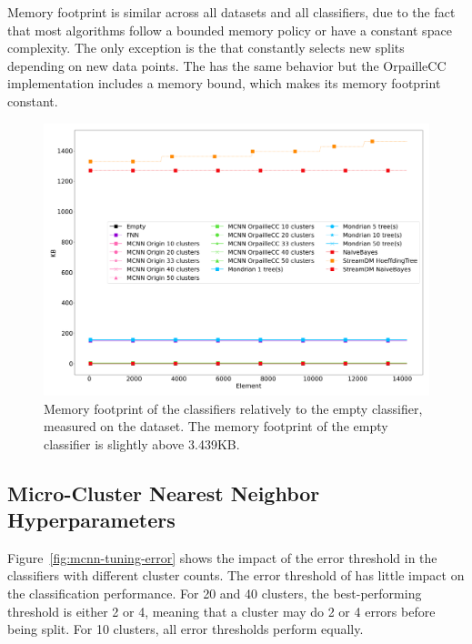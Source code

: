 Memory footprint is similar across all datasets and all classifiers, due to the fact that most
algorithms follow a bounded memory policy or have a constant space complexity.
The only exception is the \hoeffdingtree that constantly selects new splits
depending on new data points. The \mondrianforest has the same behavior but the
OrpailleCC implementation includes a memory bound, which makes its memory
footprint constant.


\begin{figure}
	\includegraphics[width=\linewidth]{figures/results/banos_3_memory.png}
	\caption{Memory footprint of the classifiers relatively to the empty
	classifier, measured on the \banosdataset dataset. The memory footprint of the empty
	classifier is slightly above 3.439KB.}
	\label{fig:memory}
\end{figure}


\subsection{Micro-Cluster Nearest Neighbor Hyperparameters}

Figure~\ref{fig:mcnn-tuning-error} shows the impact of the error threshold
in the \mcnn classifiers with different cluster counts. The error
threshold of \mcnn has little impact on the classification performance. For
20 and 40 clusters, the best-performing threshold is either 2 or 4, meaning
that a cluster may do 2 or 4 errors before being split. For 10 clusters,
all error thresholds perform equally.


